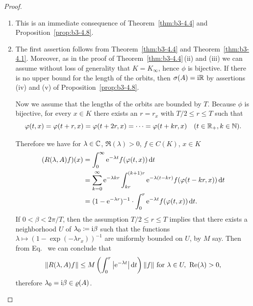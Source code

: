 \begin{proof}
\begin{enumerate}[\upshape (i), wide, labelindent=.25em]%
\item 
	This is an immediate consequence of Theorem~\ref{thm:b3-4.4} and Proposition~\ref{prop:b3-4.8}.
	
\item 
	The first assertion follows from Theorem~\ref{thm:b3-4.4} and Theorem~\ref{thm:b3-4.1}.
	Moreover, as in the proof of Theorem~\ref{thm:b3-4.4}\,(ii) and (iii) we can assume without loss of generality that $K = K_{\infty}$, hence $\phi$ is bijective.
	If there is no upper bound for the length of the orbits, then $\sigma(A) = \mathrm{i}\mathbb{R}$ by assertions (iv) and (v) of Proposition~\ref{prop:b3-4.8}.
	
	Now we assume that the lengths of the orbits are bounded by $T$.
	Because $\phi$ is bijective, for every $x \in K$ there exists an $r = r_{x}$ with $T/2 \leq r \leq T$ such that 
	\[
	\phi(t,x) = \phi(t+r,x) = \phi(t+2r,x) = \cdots = \phi(t+kr,x) \quad (t \in \R_{+}, k \in \N).
	\]
	
	Therefore we have for $\lambda \in \mathbb{C}$, $\Re(\lambda) > 0$, $f \in C(K)$, $x \in K$
	\begin{equation}\label{eq:b3-4.15}
		\begin{split}
			(R(\lambda,A)f)(x) &= \int_{0}^{\infty} \eu^{-\lambda t}f(\phi(t,x)) \dt \\
			&= \sum_{k=0}^{\infty} \eu^{-\lambda kr}\int_{kr}^{(k+1)r} \eu^{-\lambda(t-kr)} f(\phi(t-kr,x)) \dt \\
			&= (1 - \eu^{-\lambda r})^{-1}\cdot\int_{0}^{r} \eu^{-\lambda t} f(\phi(t,x)) \dt .
		\end{split}
	\end{equation}
	If\/ $0 < \beta < 2\pi/T$, then the assumption $T/2 \leq r \leq T$ implies that there exists a neighborhood $U$ of\/ $\lambda_{0} \coloneq \mathrm{i}\beta$ such that the functions $\lambda \mapsto (1 - \exp(-\lambda r_{x}))^{-1}$ are uniformly bounded on $U$, by $M$ say.
    Then from Eq.~ we can conclude that 
    \[
    \|R(\lambda,A)f\| \leq M\left(\int_{0}^{r} \left|\eu^{-\lambda t}\right|\dt\right)\|f\| \text{ for } \lambda \in U , \ \Re(\lambda) > 0 , 
    \]
    therefore $\lambda_{0} = \im\beta \in \rho(A)$.
    \qedhere
\end{enumerate}
\end{proof}
